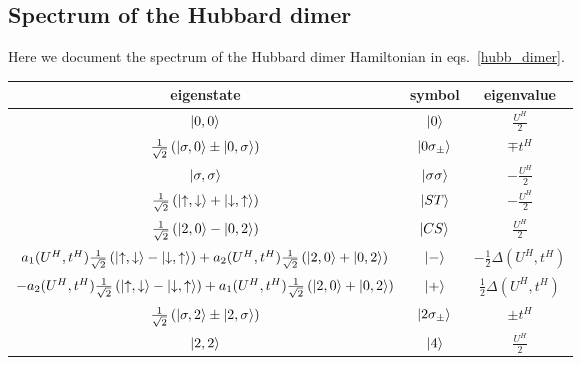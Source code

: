 \documentclass{report}
\numberwithin{equation}{section}
\begin{document}
\begin{appendices}
\section{Spectrum of the Hubbard dimer}
Here we document the spectrum of the Hubbard dimer Hamiltonian in eqs.~\ref{hubb_dimer}.
\begin{center}
	\begin{tabular}{|c|c|c|}
	\hline
	eigenstate & symbol & eigenvalue \\
	\hline
	$\ket{0,0}$ & $\ket{0}$ & \( \frac{U^H}{2}\)\\
	$ \frac{1}{\sqrt 2}\left(\ket{\sigma,0} \pm \ket{0,\sigma}\right)$ & $\ket{0\sigma_\pm}$ & \(\mp t^H\)\\
	$\ket{\sigma,\sigma}$ & $\ket{\sigma\sigma}$ & \( -\frac{U^H}{2}\)\\
	$ \frac{1}{\sqrt 2}\left(\ket{\uparrow,\downarrow} + \ket{\downarrow,\uparrow}\right)$ & $\ket{ST}$ & \( -\frac{U^H}{2}\)\\
	$ \frac{1}{\sqrt 2}\left(\ket{2,0} - \ket{0,2}\right)$ & $\ket{CS}$ & \( \frac{U^H}{2}\)\\
	$a_1(U^H, t^H) \frac{1}{\sqrt 2}\left(\ket{\uparrow,\downarrow} - \ket{\downarrow,\uparrow}\right) + a_2(U^H, t^H)\frac{1}{\sqrt 2}\left(\ket{2,0} + \ket{0,2}\right)$ & $\ket{-}$ & \(-\frac{1}{2}\Delta(U^H, t^H)\)\\
	$-a_2(U^H, t^H) \frac{1}{\sqrt 2}\left(\ket{\uparrow,\downarrow} - \ket{\downarrow,\uparrow}\right) + a_1(U^H, t^H)\frac{1}{\sqrt 2}\left(\ket{2,0} + \ket{0,2}\right)$ & $\ket{+}$ & \(\frac{1}{2}\Delta(U^H, t^H)\)\\
	$ \frac{1}{\sqrt 2}\left(\ket{\sigma,2} \pm \ket{2,\sigma}\right)$ & $\ket{2\sigma_\pm}$ & \(\pm t^H\)\\
	$\ket{2,2}$ & $\ket{4}$ & \( \frac{U^H}{2}\)\\
\hline
	\end{tabular}
	\label{hubb_dim_spectrum}
\end{center}


\end{appendices}
\end{document}

